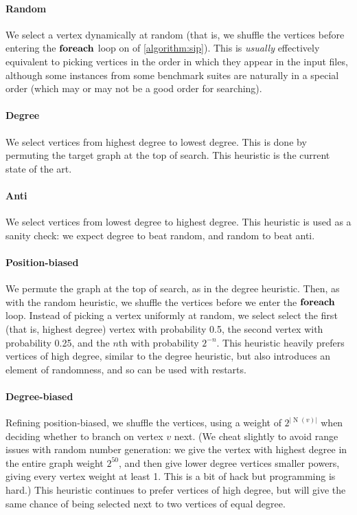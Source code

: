 \documentclass{article}
\newcommand{\neighbourhood}{\operatorname{N}}
\begin{document}
\paragraph{Random} We select a vertex dynamically at random (that is, we shuffle the vertices before
entering the $\KwSty{foreach}$ loop on  of \cref{algorithm:sip}). This is
\emph{usually} effectively equivalent to picking vertices in the order in which they appear in the
input files, although some instances from some benchmark suites are naturally in a special order
(which may or may not be a good order for searching).

\paragraph{Degree} We select vertices from highest degree to lowest degree. This is done by
permuting the target graph at the top of search. This heuristic is the current state of the art.

\paragraph{Anti} We select vertices from lowest degree to highest degree. This heuristic is used as
a sanity check: we expect degree to beat random, and random to beat anti.

\paragraph{Position-biased} We permute the graph at the top of search, as in the degree heuristic.
Then, as with the random heuristic, we shuffle the vertices before we enter the $\KwSty{foreach}$
loop. Instead of picking a vertex uniformly at random, we select select the first (that is, highest
degree) vertex with probability 0.5, the second vertex with probability 0.25, and the $n$th with
probability $2^{-n}$.  This heuristic heavily prefers vertices of high degree, similar to the
degree heuristic, but also introduces an element of randomness, and so can be used with restarts.

\paragraph{Degree-biased} Refining position-biased, we shuffle the vertices, using a weight of
$2^{\left|\neighbourhood(v)\right|}$ when deciding whether to branch on vertex $v$ next. (We cheat
slightly to avoid range issues with random number generation: we give the vertex with highest degree
in the entire graph weight $2^{50}$, and then give lower degree vertices smaller powers, giving
every vertex weight at least 1.  This is a bit of hack but programming is hard.) This heuristic
continues to prefer vertices of high degree, but will give the same chance of being selected next to
two vertices of equal degree.
\end{document}
